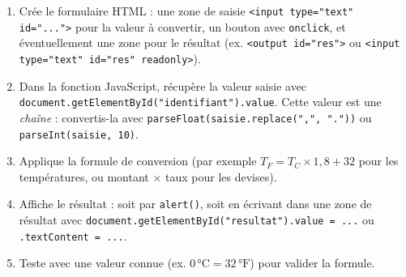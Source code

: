 \documentclass[11pt]{article}
\newcommand{\cle}[1]{{\popxbold\color{popdark}#1}}
\begin{document}
\begin{methode}
\begin{enumerate}
  \item Crée le formulaire HTML : une \cle{zone de saisie} \texttt{<input type="text" id="...">} pour la valeur à convertir, un bouton avec \texttt{onclick}, et éventuellement une zone pour le résultat (ex. \texttt{<output id="res">} ou \texttt{<input type="text" id="res" readonly>}).
  \item Dans la fonction JavaScript, \cle{récupère} la valeur saisie avec \texttt{document.getElementById("identifiant").value}. Cette valeur est une \emph{chaîne} : convertis-la avec \texttt{parseFloat(saisie.replace(",", "."))} ou \texttt{parseInt(saisie, 10)}.
  \item Applique la \cle{formule de conversion} (par exemple $T_F = T_C \times 1,8 + 32$ pour les températures, ou montant $\times$ taux pour les devises).
  \item \cle{Affiche} le résultat : soit par \texttt{alert()}, soit en écrivant dans une zone de résultat avec \texttt{document.getElementById("resultat").value = ...} ou \texttt{.textContent = ...}.
  \item Teste avec une valeur connue (ex. $0\,°\mathrm{C} = 32\,°\mathrm{F}$) pour valider la formule.
\end{enumerate}
\end{methode}
\end{document}

